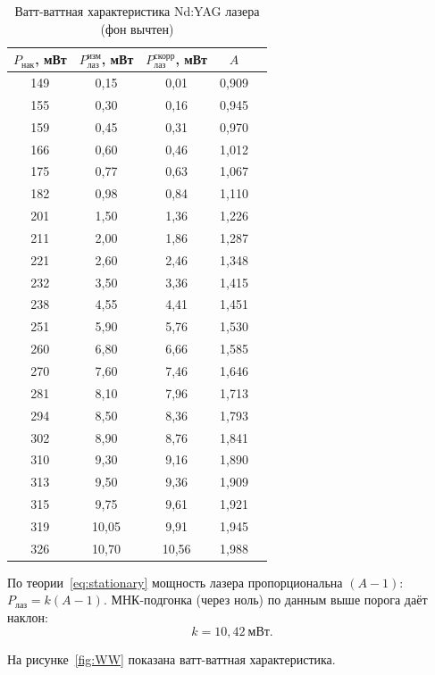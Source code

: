 \documentclass[12pt,a4paper]{article}
\begin{document}
\begin{table}[H]
  \centering
  \caption{Ватт-ваттная характеристика Nd:YAG лазера (фон вычтен)}
  \label{tab:task2}
  \begin{tabular}{ccccc}
    \toprule
    $P_\text{нак}$, мВт & $P_\text{лаз}^\text{изм}$, мВт &
    $P_\text{лаз}^\text{скорр}$, мВт & $A$ \\
    \midrule
    149 & 0,15 & 0,01  & 0,909 \\
    155 & 0,30 & 0,16  & 0,945 \\
    159 & 0,45 & 0,31  & 0,970 \\
    166 & 0,60 & 0,46  & 1,012 \\
    175 & 0,77 & 0,63  & 1,067 \\
    182 & 0,98 & 0,84  & 1,110 \\
    201 & 1,50 & 1,36  & 1,226 \\
    211 & 2,00 & 1,86  & 1,287 \\
    221 & 2,60 & 2,46  & 1,348 \\
    232 & 3,50 & 3,36  & 1,415 \\
    238 & 4,55 & 4,41  & 1,451 \\
    251 & 5,90 & 5,76  & 1,530 \\
    260 & 6,80 & 6,66  & 1,585 \\
    270 & 7,60 & 7,46  & 1,646 \\
    281 & 8,10 & 7,96  & 1,713 \\
    294 & 8,50 & 8,36  & 1,793 \\
    302 & 8,90 & 8,76  & 1,841 \\
    310 & 9,30 & 9,16  & 1,890 \\
    313 & 9,50 & 9,36  & 1,909 \\
    315 & 9,75 & 9,61  & 1,921 \\
    319 & 10,05 & 9,91 & 1,945 \\
    326 & 10,70 & 10,56 & 1,988 \\
    \bottomrule
  \end{tabular}
\end{table}

По теории~\eqref{eq:stationary} мощность лазера пропорциональна $(A-1)$:
$P_\text{лаз} = k(A-1)$. МНК-подгонка (через ноль) по данным выше порога даёт
наклон:
\begin{equation}
  k = 10{,}42~\text{мВт}.
  \label{eq:k}
\end{equation}

На рисунке~\ref{fig:WW} показана ватт-ваттная характеристика.
\end{document}
